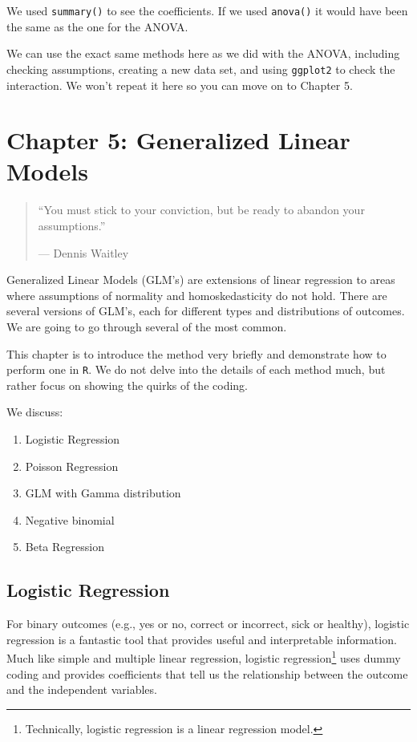 \documentclass[]{tufte-book}
\providecommand{\tightlist}{%
  \setlength{\itemsep}{0pt}\setlength{\parskip}{0pt}}
\theoremstyle{definition}
\theoremstyle{definition}
\theoremstyle{remark}
\begin{document}
We used \texttt{summary()} to see the coefficients. If we used
\texttt{anova()} it would have been the same as the one for the ANOVA.

We can use the exact same methods here as we did with the ANOVA,
including checking assumptions, creating a new data set, and using
\texttt{ggplot2} to check the interaction. We won't repeat it here so
you can move on to Chapter 5.

\chapter*{Chapter 5: Generalized Linear
Models}\label{chapter-5-generalized-linear-models}

\begin{quote}
``You must stick to your conviction, but be ready to abandon your
assumptions.''

--- Dennis Waitley
\end{quote}

Generalized Linear Models (GLM's) are extensions of linear regression to
areas where assumptions of normality and homoskedasticity do not hold.
There are several versions of GLM's, each for different types and
distributions of outcomes. We are going to go through several of the
most common.

This chapter is to introduce the method very briefly and demonstrate how
to perform one in \texttt{R}. We do not delve into the details of each
method much, but rather focus on showing the quirks of the coding.

We discuss:

\begin{enumerate}
\def\labelenumi{\arabic{enumi}.}
\tightlist
\item
  Logistic Regression
\item
  Poisson Regression
\item
  GLM with Gamma distribution
\item
  Negative binomial
\item
  Beta Regression
\end{enumerate}

\section*{Logistic Regression}\label{logistic-regression}

For binary outcomes (e.g., yes or no, correct or incorrect, sick or
healthy), logistic regression is a fantastic tool that provides useful
and interpretable information. Much like simple and multiple linear
regression, logistic regression\footnote{Technically, logistic
  regression is a linear regression model.} uses dummy coding and
provides coefficients that tell us the relationship between the outcome
and the independent variables.
\end{document}
